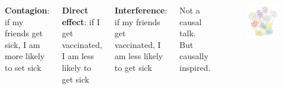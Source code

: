 \documentclass[aspectratio=169]{beamer}
\theoremstyle{remark}
\begin{document}
\begin{frame}
    \begin{columns}
        \vspace{7mm}
        
        \textbf{Contagion}: if my friends get sick, I am more likely to set sick
        
        \vspace{4mm}
        
        \textbf{Direct effect}: if I get vaccinated, I am less likely to get sick
        
        \vspace{4mm}
        
        \textbf{Interference}: if my friends get vaccinated, I am less likely to get sick
        
        \vspace{7mm}
        
        {\footnotesize * Not a causal talk. But causally inspired.}
        
        \begin{figure}[ht]
            \centering
            \includegraphics[width=\textwidth]{figures/assortative.png}
        \end{figure}
    \end{columns}
\end{frame}
\end{document}
